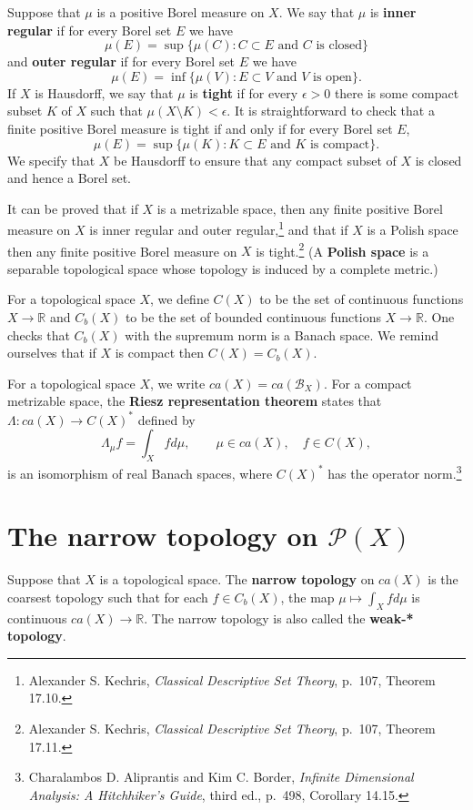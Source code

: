\documentclass{article}
\theoremstyle{definition}
\begin{document}
Suppose that $\mu$ is a positive Borel measure on $X$. We say that $\mu$
is \textbf{inner regular} if for every Borel set $E$ we have
\[
\mu(E) = \sup\{\mu(C): \textrm{$C \subset E$ and $C$ is closed}\}
\]
and \textbf{outer regular} if for every Borel set $E$ we have
\[
\mu(E) = \inf\{\mu(V): \textrm{$E \subset V$ and $V$ is open}\}.
\]
If $X$ is Hausdorff,
we say that $\mu$ is \textbf{tight} if for every $\epsilon>0$ there is some  compact  subset $K$ of $X$ such that
$\mu(X \setminus K)<\epsilon$. It is straightforward to check that a finite positive Borel measure is tight if and only if for every Borel set $E$,
\[
\mu(E) = \sup\{\mu(K): \textrm{$K \subset E$ and $K$ is compact}\}.
\]
We specify that $X$ be Hausdorff to ensure that any compact subset of $X$ is closed and hence a Borel set. 



It can be proved that if $X$ is a metrizable space, then any finite positive Borel measure on $X$ is 
inner regular and outer regular,\footnote{Alexander S. Kechris, {\em Classical Descriptive Set Theory}, p.~107,
Theorem 17.10.} and that if $X$ is a Polish space then any finite positive Borel measure on $X$ is tight.\footnote{Alexander S. Kechris, {\em Classical Descriptive Set Theory},
p.~107,
Theorem 17.11.} (A \textbf{Polish space} is a separable topological space whose topology is induced by a  complete metric.)

For a topological space $X$, we define 
$C(X)$ to be the set of continuous functions $X \to \mathbb{R}$ and
$C_b(X)$ to be the set of bounded
continuous functions $X \to \mathbb{R}$. One checks that $C_b(X)$ with the supremum norm is a Banach space. We remind ourselves
that if $X$ is compact then $C(X)=C_b(X)$. 

For a topological space $X$, 
we write $ca(X) = ca(\mathscr{B}_X)$.
For a compact metrizable  space, the \textbf{Riesz representation theorem} states that
$\Lambda:ca(X) \to C(X)^*$ defined by
\[
\Lambda_\mu f = \int_X f d\mu, \qquad  \mu \in ca(X), \quad f \in C(X),
\]
is an isomorphism of real Banach spaces, where $C(X)^*$ has the operator norm.\footnote{Charalambos D. 
Aliprantis and Kim C. Border, {\em Infinite Dimensional Analysis: A Hitchhiker's Guide}, third ed., p.~498,
Corollary 14.15.} 


\section{The narrow topology on $\mathscr{P}(X)$}
Suppose that $X$ is a topological space. The \textbf{narrow topology} on $ca(X)$ is the coarsest topology such that for each
$f \in C_b(X)$, the map $\mu \mapsto \int_X f d\mu$ is continuous $ca(X) \to \mathbb{R}$. The narrow topology is also called
the \textbf{weak-* topology}. 
\end{document}
